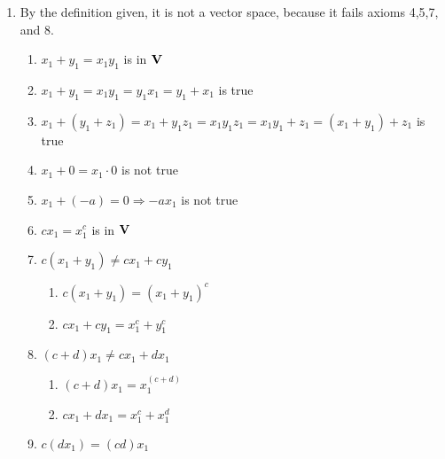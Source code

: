 \documentclass[12pt]{article}
\newcommand{\xmark}{\ding{55}}
\begin{document}
\begin{enumerate}
  \item By the definition given, it is not a vector space, because it fails axioms 4,5,7, and 8.

    \begin{enumerate}

      \item $x_1+y_1=x_1y_1$ is in $\bold{V}$ \textcolor{green}{\checkmark}

      \item $x_1+y_1=x_1y_1=y_1x_1=y_1+x_1$ is true \textcolor{green}{\checkmark}

      \item  $x_1+(y_1+z_1)=x_1+y_1z_1=x_1y_1z_1=x_1y_1+z_1=(x_1+y_1)+z_1$ is true \textcolor{green}{\checkmark}

      \item $x_1+0=x_1\cdot0$ is not true \textcolor{red}{\xmark}

      \item $x_1+(-a)=0\Rightarrow-ax_1$ is not true \textcolor{red}{\xmark}

      \item $cx_1=x_1^c$ is in $\bold{V}$ \textcolor{green}{\checkmark}

      \item $c(x_1+y_1)\neq cx_1+cy_1$ \textcolor{red}{\xmark}

          \begin{enumerate}

            \item $c(x_1+y_1)=(x_1+y_1)^c$

                \item $cx_1+cy_1=x_1^c+y_1^c$

            \end{enumerate}

          \item $(c+d)x_1\neq cx_1+dx_1$ \textcolor{red}{\xmark}

          \begin{enumerate}

            \item $(c+d)x_1=x_1^{(c+d)}$

                \item $cx_1+dx_1=x_1^c+x_1^d$

            \end{enumerate}

          \item $c(dx_1)=(cd)x_1$ \textcolor{green}{\checkmark}


\end{enumerate}
\end{enumerate}
\end{document}
